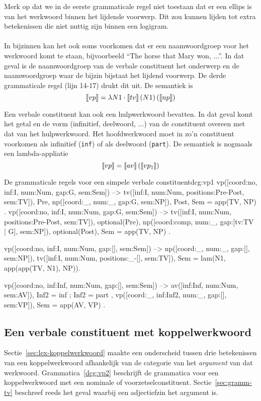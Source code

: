 Merk op dat we in de eerste grammaticale regel niet toestaan dat er een ellips is van het werkwoord binnen het lijdende voorwerp. Dit zou kunnen lijden tot extra betekenissen die niet nuttig zijn binnen een logigram.

\paragraph{} In bijzinnen kan het ook soms voorkomen dat er een naamwoordgroep voor het werkwoord komt te staan, bijvoorbeeld ``The horse that Mary won, ...''. In dat geval is de naamwoordgroep van de verbale constituent het onderwerp en de naamwoordgroep waar de bijzin bijstaat het lijdend voorwerp. De derde grammaticale regel (lijn 14-17) drukt dit uit. De semantiek is $$\llbracket vp\rrbracket = \lambda N1 \cdot \llbracket tv\rrbracket \left( N1 \right) \left( \llbracket np\rrbracket \right)$$

Een verbale constituent kan ook een hulpwerkwoord bevatten. In dat geval komt het getal en de vorm (infinitief, deelwoord, ...) van de constituent overeen met dat van het hulpwerkwoord. Het hoofdwerkwoord moet in zo'n constituent voorkomen als infinitief (\texttt{inf}) of als deelwoord (\texttt{part}). De semantiek is nogmaals een lambda-appliatie $$\llbracket vp\rrbracket = \llbracket av\rrbracket \left( \llbracket vp_1\rrbracket \right)$$

\begin{dcg}{De grammaticale regels voor een simpele verbale constituent}{dcg:vp1}
vp([coord:no, inf:I, num:Num, gap:G, sem:Sem]) -->
  tv([inf:I, num:Num, positions:Pre-Post, sem:TV]),
  Pre,
  np([coord:_, num:_, gap:G, sem:NP]),
  Post,
  { Sem = app(TV, NP) }.
vp([coord:no, inf:I, num:Num, gap:G, sem:Sem]) -->
  tv([inf:I, num:Num, positions:Pre-Post, sem:TV]),
  optional(Pre),
  np([coord:comp, num:_, gap:[tv:TV | G], sem:NP]),
  optional(Post),
  { Sem = app(TV, NP) }.

vp([coord:no, inf:I, num:Num, gap:[], sem:Sem]) -->
  np([coord:_, num:_, gap:[], sem:NP]),
  tv([inf:I, num:Num, positions:_-[], sem:TV]),
  { Sem = lam(N1, app(app(TV, N1), NP))}.

vp([coord:no, inf:Inf, num:Num, gap:[], sem:Sem]) -->
  av([inf:Inf, num:Num, sem:AV]),
  { Inf2 = inf ; Inf2 = part },
  vp([coord:_, inf:Inf2, num:_, gap:[], sem:VP]),
  { Sem = app(AV, VP) }.
\end{dcg}

\subsection{Een verbale constituent met koppelwerkwoord}
\label{sec:gram-koppelwerkwoord}
Sectie~\ref{sec:lex-koppelwerkwoord} maakte een onderscheid tussen drie betekenissen van een koppelwerkwoord afhankelijk van de categorie van het \textit{argument} van dat werkwoord. Grammatica~\ref{dcg:vp2} beschrijft de grammatica voor een koppelwerkwoord met een nominale of voorzetselconstituent. Sectie~\ref{sec:gramm-tv} beschreef reeds het geval waarbij een adjectiefzin het argument is.

